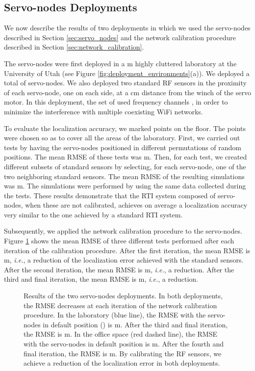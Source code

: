 \documentclass[conference]{IEEEtran}
\begin{document}
\subsection{Servo-nodes Deployments}
\label{sec:servo_nodes_deployments}

We now describe the results of two deployments in which we used the servo-nodes described in Section \ref{sec:servo_nodes} and the network calibration procedure described in Section \ref{sec:network_calibration}.

The servo-nodes were first deployed in a  m highly cluttered laboratory at the University of Utah (see Figure \ref{fig:deployment_environments}(a)). We deployed a total of  servo-nodes. We also deployed two standard RF sensors in the proximity of each servo-node, one on each side, at a  cm distance from the winch of the servo motor. In this deployment, the set of used frequency channels , in order to minimize the interference with multiple coexisting WiFi networks.

To evaluate the localization accuracy, we marked  points on the floor. The points were chosen so as to cover all the areas of the laboratory. First, we carried out  tests by having the  servo-nodes positioned in  different permutations of random positions. The mean RMSE of these tests was  m. Then, for each test, we created  different subsets of  standard sensors by selecting, for each servo-node, one of the two neighboring standard sensors. The mean RMSE of the resulting  simulations was  m. The simulations were performed by using the same data collected during the tests. These results demonstrate that the RTI system composed of servo-nodes, when these are not calibrated, achieves on average a localization accuracy very similar to the one achieved by a standard RTI system.

Subsequently, we applied the network calibration procedure to the servo-nodes. Figure \ref{fig:servo_nodes_results} shows the mean RMSE of three different tests performed after each iteration of the calibration procedure. After the first iteration, the mean RMSE is  m, \emph{i.e.}, a  reduction of the localization error achieved with the standard sensors. After the second iteration, the mean RMSE is  m, \emph{i.e.}, a  reduction. After the third and final iteration, the mean RMSE is  m, \emph{i.e.}, a  reduction.

\begin{figure}[t]
    \begin{center}
        \caption{Results of the two servo-nodes deployments. In both deployments, the RMSE decreases at each iteration of the network calibration procedure. In the laboratory (blue line), the RMSE with the servo-nodes in default position () is  m. After the third and final iteration, the RMSE is  m. In the office space (red dashed line), the RMSE with the servo-nodes in default position is  m. After the fourth and final iteration, the RMSE is  m. By calibrating the RF sensors, we achieve a  reduction of the localization error in both deployments.}
        \label{fig:servo_nodes_results}
    \end{center}
\end{figure}
\end{document}
